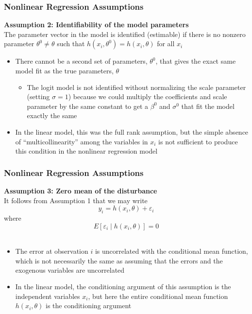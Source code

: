 \documentclass{beamer}
\begin{document}
\begin{frame}\frametitle{Nonlinear Regression Assumptions}
    \textbf{Assumption 2: Identifiability of the model parameters} \\
    \vspace{3ex}
    The parameter vector in the model is identified (estimable) if there is no nonzero parameter $\theta^0 \neq \theta$ such that $h(x_i, \theta^0) = h(x_i, \theta)$ for all $x_i$
    \begin{itemize}
         \item There cannot be a second set of parameters, $\theta^0$, that gives the exact same model fit as the true parameters, $\theta$
         \begin{itemize}
             \item The logit model is not identified without normalizing the scale parameter (setting $\sigma = 1$) because we could multiply the coefficients and scale parameter by the same constant to get a $\beta^0$ and $\sigma^0$ that fit the model exactly the same
         \end{itemize}
         \item In the linear model, this was the full rank assumption, but the simple absence of ``multicollinearity'' among the variables in $x_i$ is not sufficient to produce this condition in the nonlinear regression model
     \end{itemize} 
\end{frame}

\begin{frame}\frametitle{Nonlinear Regression Assumptions}
    \textbf{Assumption 3: Zero mean of the disturbance} \\
    \vspace{3ex}
    It follows from Assumption 1 that we may write
    $$y_i = h(x_i, \theta) + \varepsilon_i$$
    where 
    $$E[\varepsilon_i \mid h(x_i, \theta)] = 0$$ \\
    \begin{itemize}
        \item The error at observation $i$ is uncorrelated with the conditional mean function, which is not necessarily the same as assuming that the errors and the exogenous variables are uncorrelated
        \item In the linear model, the conditioning argument of this assumption is the independent variables $x_i$, but here the entire conditional mean function $h(x_i, \theta)$ is the conditioning argument
    \end{itemize}
\end{frame}
\end{document}
